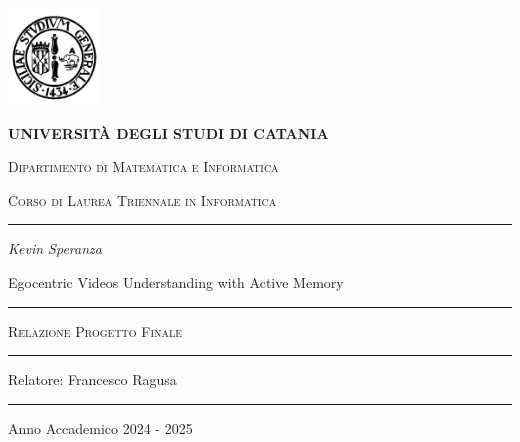 \begin{titlepage}
\centering 
\includegraphics[width=2.434cm,height=2.565cm]{Images/university_logo.png}

\bigskip

{\Large \textbf{UNIVERSIT\`A DEGLI STUDI DI CATANIA}}

{\scshape
\large
Dipartimento di Matematica e Informatica
}

{\scshape
\normalsize
Corso di Laurea Triennale in Informatica
}

\bigskip


\hrule


\bigskip


\bigskip


\bigskip


\bigskip

{\itshape
\large
Kevin Speranza
\par}


\bigskip


\bigskip


\bigskip


\bigskip

{\centering
\Large
Egocentric Videos Understanding with Active Memory
\par}


\bigskip


\bigskip


\bigskip


\bigskip


\bigskip


\bigskip


\begin{minipage}[b]{8 cm}
\hrule

\bigskip

{\centering\scshape 
Relazione Progetto Finale
\par}


\bigskip

\hrule
\end{minipage}
\bigskip


\bigskip


\bigskip


\bigskip


\bigskip


\bigskip


\bigskip


\bigskip


\bigskip


\bigskip


\bigskip

{\raggedleft
Relatore: Francesco Ragusa
\par}


\bigskip


\bigskip


\bigskip


\bigskip

\hrule

\bigskip

{\centering
Anno Accademico 2024 - 2025
\par}
\end{titlepage}
